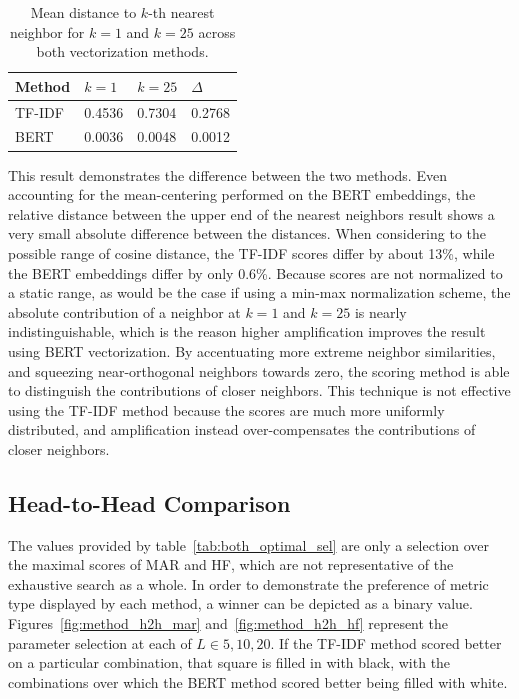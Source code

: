 \documentclass[11pt]{article}
\theoremstyle{plain}
\theoremstyle{definition}
\begin{document}
\begin{table}
    \centering
    \begin{tabular}{| m{4em} | m{3em} | m{3em} | m{3em} |}
        \hline
        Method & $k=1$  & $k=25$ & $\Delta$ \\
        \hline
        \hline
        TF-IDF & 0.4536 & 0.7304 & 0.2768   \\
        \hline
        BERT   & 0.0036 & 0.0048 & 0.0012   \\
        \hline
    \end{tabular}
    \caption{Mean distance to $k$-th nearest neighbor for $k=1$ and $k=25$ across both vectorization methods.}\label{tab:mean_distance_at}
\end{table}

This result demonstrates the difference between the two methods. Even accounting for the mean-centering performed on the BERT embeddings, the relative distance between the upper end of the nearest neighbors result shows a very small absolute difference between the distances. When considering to the possible range of cosine distance, the TF-IDF scores differ by about 13\%, while the BERT embeddings differ by only 0.6\%. Because scores are not normalized to a static range, as would be the case if using a min-max normalization scheme, the absolute contribution of a neighbor at $k=1$ and $k=25$ is nearly indistinguishable, which is the reason higher amplification improves the result using BERT vectorization. By accentuating more extreme neighbor similarities, and squeezing near-orthogonal neighbors towards zero, the scoring method is able to distinguish the contributions of closer neighbors. This technique is not effective using the TF-IDF method because the scores are much more uniformly distributed, and amplification instead over-compensates the contributions of closer neighbors.

\subsection{Head-to-Head Comparison}\label{sec:analsysis-comparison}

The values provided by table~\ref{tab:both_optimal_sel} are only a selection over the maximal scores of MAR and HF, which are not representative of the exhaustive search as a whole. In order to demonstrate the preference of metric type displayed by each method, a winner can be depicted as a binary value. Figures~\ref{fig:method_h2h_mar} and~\ref{fig:method_h2h_hf} represent the parameter selection at each of  $L \in {5, 10, 20}$. If the TF-IDF method scored better on a particular combination, that square is filled in with black, with the combinations over which the BERT method scored better being filled with white.
\end{document}
